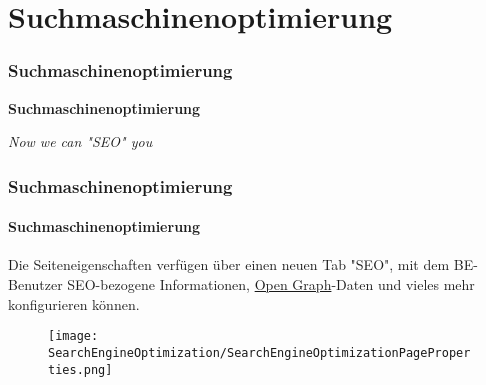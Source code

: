 %

\section{Suchmaschinenoptimierung}
\begin{frame}[fragile]
	\frametitle{Suchmaschinenoptimierung}

	\begin{center}\huge{\color{typo3darkgrey}\textbf{Suchmaschinenoptimierung}}\end{center}
	\begin{center}\large{\textit{Now we can "SEO" you}}\end{center}

\end{frame}


\begin{frame}[fragile]
	\frametitle{Suchmaschinenoptimierung}
	\framesubtitle{Suchmaschinenoptimierung}

	Die Seiteneigenschaften verfügen über einen neuen Tab "SEO", mit dem BE-Benutzer
	SEO-bezogene Informationen, \href{http://ogp.me/}{Open Graph}-Daten und vieles mehr konfigurieren können.

	\begin{figure}
		\texttt{[image: SearchEngineOptimization/SearchEngineOptimizationPageProperties.png]}
	\end{figure}

\end{frame}


